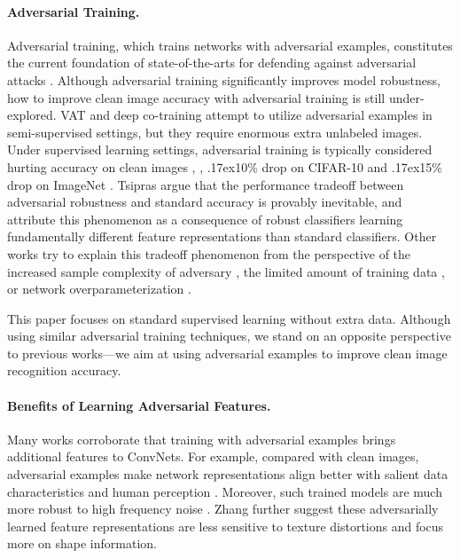 \documentclass[10pt,twocolumn,letterpaper]{article}
\newcommand{\app}{\raise.17ex\hbox{}}
\begin{document}
\paragraph{Adversarial Training.} Adversarial training, which trains networks with adversarial examples, constitutes the current foundation of state-of-the-arts for defending against adversarial attacks \cite{Goodfellow2015,Kurakin2017,Madry2018,Xie2019}. Although adversarial training significantly improves model robustness, how to improve clean image accuracy with adversarial training is still under-explored. VAT \cite{Miyato2018} and deep co-training \cite{Qiao2018} attempt to utilize adversarial examples in semi-supervised settings, but they require enormous extra unlabeled images. Under supervised learning settings, adversarial training is typically considered hurting accuracy on clean images \cite{raghunathan2019adversarial}, \eg, \app10\% drop on CIFAR-10 \cite{Madry2018} and \app15\% drop on ImageNet \cite{Xie2019}. Tsipras \etal \cite{Tsipras2018} argue that the performance tradeoff between adversarial robustness and standard accuracy is provably inevitable, and attribute this phenomenon as a consequence of robust classifiers learning fundamentally different feature representations than standard classifiers. Other works try to explain this tradeoff phenomenon from the perspective of the increased sample complexity of adversary \cite{stutz2019disentangling,min2020curious,nakkiran2019adversarial}, the limited amount of training data \cite{carmon2019unlabeled,najafi2019robustness,schmidt2018adversarially,alayrac2019labels,zhai2019adversarially}, or network overparameterization \cite{raghunathan2020understanding}.


This paper focuses on standard supervised learning without extra data. Although using similar adversarial training techniques, we stand on an opposite perspective to previous works---we aim at using adversarial examples to improve clean image recognition accuracy.


\paragraph{Benefits of Learning Adversarial Features.} Many works corroborate that training with adversarial examples brings additional features to ConvNets. For example, compared with clean images, adversarial examples make network representations align better with salient data characteristics and human perception \cite{Tsipras2018}. Moreover, such trained models are much more robust to high frequency noise \cite{Yin2019}. Zhang \etal \cite{Zhang2019c} further suggest these adversarially learned feature representations are less sensitive to texture distortions and focus more on shape information. 
\end{document}
